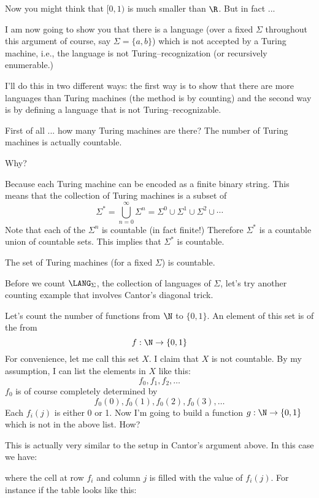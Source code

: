 Now you might think that $[0,1)$ is much smaller than $\R$.
But in fact ...



\newpage
I am now going to show you that there is a language
(over a fixed $\Sigma$ throughout this argument of course, 
say $\Sigma = \{a,b\}$)
which is not accepted by a Turing machine, i.e.,
the language is not Turing--recognization (or recursively enumerable.)

I'll do this in two different ways:
the first way is to show that there
are more languages than Turing machines (the method is by counting)
and the second way is by defining a language that is not Turing--recognizable.

First of all ... how many Turing machines are there?
The number of Turing machines is actually countable.

Why?

Because each Turing machine can be encoded as a finite binary string.
This means that the collection of Turing machines
is a subset of 
\[
\Sigma^* 
= \bigcup_{n=0}^\infty \Sigma^n 
= \Sigma^0 \cup \Sigma^1 \cup \Sigma^2 \cup \cdots
\]
Note that each of the $\Sigma^n$ is countable (in fact finite!)
Therefore $\Sigma^*$ is a countable union of countable sets.
This implies that $\Sigma^*$ is countable.

\begin{thm}
The set of Turing machines (for a fixed $\Sigma$) is countable.
\end{thm}

Before we count $\LANG_\Sigma$,
the collection of languages of $\Sigma$,
let's try another counting example that involves Cantor's diagonal trick.

Let's count the number of functions from $\N$ to $\{0, 1\}$.
An element of this set is of the from
\[
f: \N \rightarrow \{0, 1\}
\]
For convenience, let me call this set $X$.
I claim that $X$ is not countable.
By my assumption, I can list the elements in $X$ like this:
\[
f_0, f_1, f_2, \ldots
\]
$f_0$ is of course completely determined by 
\[
f_0(0), f_0(1), f_0(2), f_0(3), \ldots
\]
Each $f_i(j)$ is either 0 or 1.
Now I'm going to build a function $g : \N \rightarrow \{0, 1\}$
which is not in the above list.
How?

This is actually very similar to the setup in Cantor's argument
above.
In this case we have:



where the cell at row $f_i$ and column $j$ is filled with the
value of $f_i(j)$.
For instance if the table looks like this:


